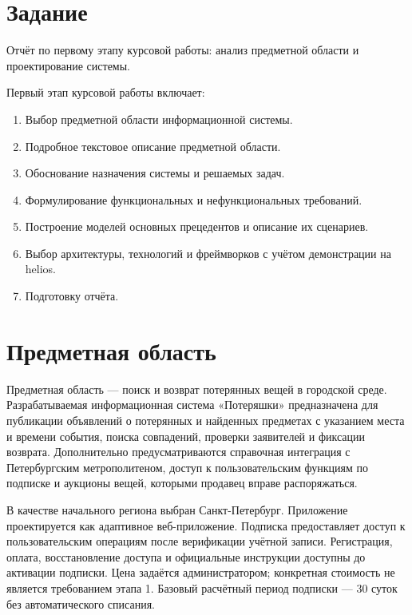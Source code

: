 \clearpage

\clearpage
\section*{Задание}
{}

Отчёт по первому этапу курсовой работы: анализ предметной области и проектирование системы.

Первый этап курсовой работы включает:

\begin{enumerate}
\item Выбор предметной области информационной системы.
\item Подробное текстовое описание предметной области.
\item Обоснование назначения системы и решаемых задач.
\item Формулирование функциональных и нефункциональных требований.
\item Построение моделей основных прецедентов и описание их сценариев.
\item Выбор архитектуры, технологий и фреймворков с учётом демонстрации на helios.
\item Подготовку отчёта.
\end{enumerate}

\clearpage
\section{Предметная область}

Предметная область — поиск и возврат потерянных вещей в городской среде. Разрабатываемая информационная система «Потеряшки» предназначена для публикации объявлений о потерянных и найденных предметах с указанием места и времени события, поиска совпадений, проверки заявителей и фиксации возврата. Дополнительно предусматриваются справочная интеграция с Петербургским метрополитеном, доступ к пользовательским функциям по подписке и аукционы вещей, которыми продавец вправе распоряжаться.

В качестве начального региона выбран Санкт-Петербург. Приложение проектируется как адаптивное веб-приложение. Подписка предоставляет доступ к пользовательским операциям после верификации учётной записи. Регистрация, оплата, восстановление доступа и официальные инструкции доступны до активации подписки. Цена задаётся администратором; конкретная стоимость не является требованием этапа 1. Базовый расчётный период подписки — 30 суток без автоматического списания.

